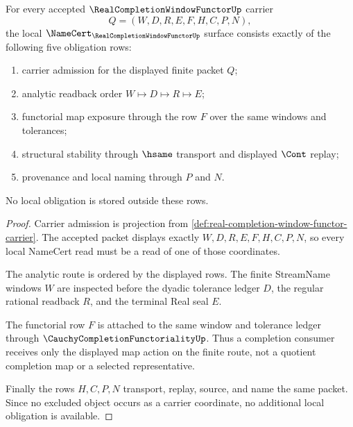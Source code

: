 \begin{theorem}
\label{thm:real-completion-window-functor-namecert-obligations}
For every accepted $\RealCompletionWindowFunctorUp$ carrier
$$
Q=(W,D,R,E,F,H,C,P,N),
$$
the local $\NameCert_{\RealCompletionWindowFunctorUp}$ surface consists exactly of the following five obligation rows:
\begin{enumerate}
\item carrier admission for the displayed finite packet $Q$;
\item analytic readback order $W \longmapsto D \longmapsto R \longmapsto E$;
\item functorial map exposure through the row $F$ over the same windows and tolerances;
\item structural stability through $\hsame$ transport and displayed $\Cont$ replay;
\item provenance and local naming through $P$ and $N$.
\end{enumerate}
No local obligation is stored outside these rows.
\end{theorem}
\begin{proof}
Carrier admission is projection from \autoref{def:real-completion-window-functor-carrier}. The accepted packet displays exactly $W,D,R,E,F,H,C,P,N$, so every local NameCert read must be a read of one of those coordinates.

The analytic route is ordered by the displayed rows. The finite StreamName windows $W$ are inspected before the dyadic tolerance ledger $D$, the regular rational readback $R$, and the terminal Real seal $E$.

The functorial row $F$ is attached to the same window and tolerance ledger through $\CauchyCompletionFunctorialityUp$. Thus a completion consumer receives only the displayed map action on the finite route, not a quotient completion map or a selected representative.

Finally the rows $H,C,P,N$ transport, replay, source, and name the same packet. Since no excluded object occurs as a carrier coordinate, no additional local obligation is available.
\end{proof}

